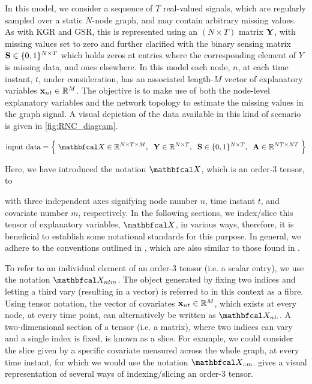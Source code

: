 In this model, we consider a sequence of $T$ real-valued signals, which are regularly sampled over a static $N$-node graph, and may contain arbitrary missing values. As with KGR and GSR, this is represented using an $(N \times T)$ matrix $\mathbf{Y}$, with missing values set to zero and further clarified with the binary sensing matrix $\mathbf{S} \in \{0, 1\}^{N \times T}$ which holds zeros at entries where the corresponding element of $Y$ is missing data, and ones elsewhere. In this model each node, $n$, at each time instant, $t$, under consideration, has an associated length-$M$ vector of explanatory variables $\mathbf{x}_{nt} \in \mathbb{R}^{M}$. The objective is to make use of both the node-level explanatory variables and the network topology to estimate the missing values in the graph signal. A visual depiction of the data available in this kind of scenario is given in \cref{fig:RNC_diagram}. 

\begin{equation*}
    \text{input data} = \Big\{ \;\Xt \in \R^{N \times T \times M}, \;\; \Y \in \R^{N \times T}, \;\; \Ss \in \{0, 1\}^{N \times T}, \;\; \A \in \R^{NT \times NT} \; \Big\}
\end{equation*}

Here, we have introduced the notation $\Xt$, which is an order-3 tensor, to 

with three independent axes signifying node number $n$, time instant $t$, and covariate number $m$, respectively. In the following sections, we index/slice this tensor of explanatory variables, $\Xt$, in various ways, therefore, it is beneficial to establish some notational standards for this purpose. In general, we adhere to the conventions outlined in \cite{Kolda2009}, which are also similar to those found in \cite{Kiers2000}. 

To refer to an individual element of an order-3 tensor (i.e. a scalar entry), we use the notation $\Xt_{ntm}$. The object generated by fixing two indices and letting a third vary (resulting in a vector) is referred to in this context as a fibre. Using tensor notation, the vector of covariates $\mathbf{x}_{nt} \in \mathbb{R}^{M}$, which exists at every node, at every time point, can alternatively be written as $\Xt_{nt:}$. A two-dimensional section of a tensor (i.e. a matrix), where two indices can vary and a single index is fixed, is known as a slice. For example, we could consider the slice given by a specific covariate measured across the whole graph, at every time instant, for which we would use the notation $\Xt_{::m}$.  gives a visual representation of several ways of indexing/slicing an order-3 tensor. 


